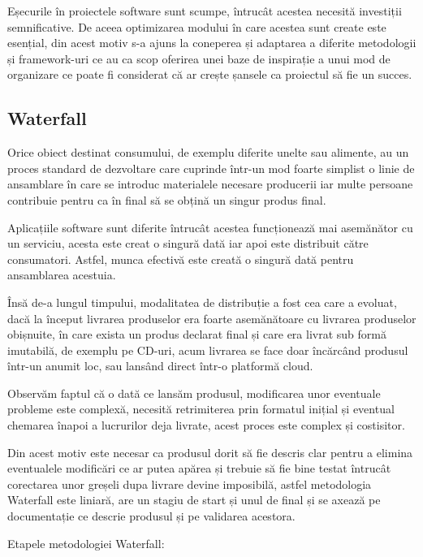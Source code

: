 Eșecurile în proiectele software sunt scumpe, întrucât acestea necesită investiții
semnificative. De aceea optimizarea modului în care acestea sunt create este esențial,
din acest motiv s-a ajuns la coneperea și adaptarea a diferite metodologii
și framework-uri ce au ca scop oferirea unei baze de inspirație
a unui mod de organizare ce poate fi considerat că ar crește șansele
ca proiectul să fie un succes.

\subsection{Waterfall}

Orice obiect destinat consumului, de exemplu diferite unelte sau alimente,
au un proces standard de dezvoltare care cuprinde într-un mod foarte simplist
o linie de ansamblare în care se introduc materialele necesare producerii
iar multe persoane contribuie pentru ca în final să se obțină un singur produs final.

Aplicațiile software sunt diferite întrucât acestea funcționează mai asemănător
cu un serviciu, acesta este creat o singură dată iar apoi este distribuit
către consumatori. Astfel, munca efectivă este creată o singură dată pentru
ansamblarea acestuia.

Însă de-a lungul timpului, modalitatea de distribuție a fost cea care a evoluat,
dacă la început livrarea produselor era foarte asemănătoare cu livrarea
produselor obișnuite, în care exista un produs declarat final și care
era livrat sub formă imutabilă, de exemplu pe CD-uri, acum livrarea se
face doar încărcând produsul într-un anumit loc, sau lansând direct
într-o platformă cloud.

Observăm faptul că o dată ce lansăm produsul, modificarea unor eventuale
probleme este complexă, necesită retrimiterea prin formatul inițial și eventual
chemarea înapoi a lucrurilor deja livrate, acest proces este complex și costisitor.

Din acest motiv este necesar ca produsul dorit să fie descris clar
pentru a elimina eventualele modificări ce ar putea apărea și trebuie să fie
bine testat întrucât corectarea unor greșeli dupa livrare devine imposibilă,
astfel metodologia Waterfall este liniară, are un stagiu de start și unul
de final și se axează pe documentație ce descrie produsul și pe validarea acestora.

Etapele metodologiei Waterfall:

